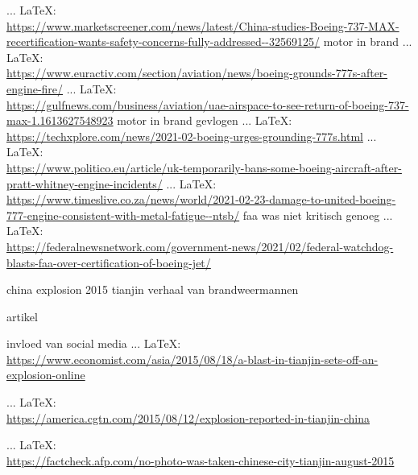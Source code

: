 \begin{thebibliography}{99}
{{{			 ... \LaTeX:\\ \url{https://www.marketscreener.com/news/latest/China-studies-Boeing-737-MAX-recertification-wants-safety-concerns-fully-addressed--32569125/}
			motor in brand
			 ... \LaTeX:\\ \url{https://www.euractiv.com/section/aviation/news/boeing-grounds-777s-after-engine-fire/}
			 ... \LaTeX:\\ \url{https://gulfnews.com/business/aviation/uae-airspace-to-see-return-of-boeing-737-max-1.1613627548923}
			motor in brand gevlogen
			 ... \LaTeX:\\ \url{https://techxplore.com/news/2021-02-boeing-urges-grounding-777s.html}
			 ... \LaTeX:\\ \url{https://www.politico.eu/article/uk-temporarily-bans-some-boeing-aircraft-after-pratt-whitney-engine-incidents/}
			 ... \LaTeX:\\ \url{https://www.timeslive.co.za/news/world/2021-02-23-damage-to-united-boeing-777-engine-consistent-with-metal-fatigue--ntsb/}
			faa was niet kritisch genoeg
			 ... \LaTeX:\\ \url{https://federalnewsnetwork.com/government-news/2021/02/federal-watchdog-blasts-faa-over-certification-of-boeing-jet/}
			
			
			
			
			
			
			
			china explosion 2015 tianjin
			verhaal van brandweermannen
			
			artikel
			
			invloed van social media
			 ... \LaTeX:\\ \url{https://www.economist.com/asia/2015/08/18/a-blast-in-tianjin-sets-off-an-explosion-online}
			
			 ... \LaTeX:\\ \url{https://america.cgtn.com/2015/08/12/explosion-reported-in-tianjin-china}
			
			 ... \LaTeX:\\ \url{https://factcheck.afp.com/no-photo-was-taken-chinese-city-tianjin-august-2015}
			
}}}
\end{thebibliography}
